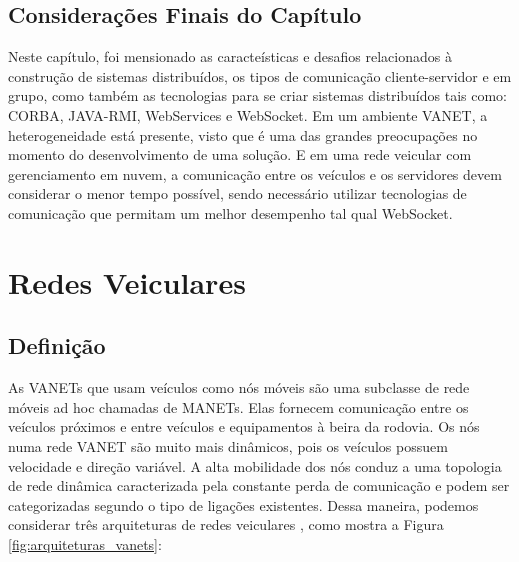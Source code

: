 \documentclass[
	12pt,				%
	oneside,			%
	a4paper,			%
	english,			%
	brazil				%
	]{abntex2ppgsi}
\begin{document}

\section{Considerações Finais do Capítulo}
 
Neste capítulo, foi mensionado as caracteísticas e desafios relacionados à construção de sistemas distribuídos, os tipos de comunicação cliente-servidor e em grupo, como também as tecnologias para se criar sistemas distribuídos tais como: CORBA, JAVA-RMI, WebServices e WebSocket. Em um ambiente VANET, a heterogeneidade está presente, visto que é uma das grandes preocupações no momento do desenvolvimento de uma solução. E em uma rede veicular com gerenciamento em nuvem, a comunicação entre os veículos e os servidores devem considerar o menor tempo possível, sendo necessário utilizar tecnologias de comunicação que permitam um melhor desempenho tal qual WebSocket.

\chapter{Redes Veiculares}

\section{Definição}

As VANETs que usam veículos como nós móveis são uma subclasse de rede móveis ad hoc chamadas de MANETs. Elas fornecem comunicação entre os veículos próximos e entre veículos e equipamentos à beira da rodovia. Os nós numa rede VANET são muito mais dinâmicos, pois os veículos possuem velocidade e direção variável. A alta mobilidade dos nós conduz a uma topologia de rede dinâmica caracterizada pela constante perda de comunicação \cite{bubenikova2014security} \cite{jakubiak2008state} e podem ser categorizadas segundo o tipo de ligações existentes. Dessa maneira, podemos considerar três arquiteturas de redes veiculares \cite{luis2009melhoria}, como mostra a Figura \ref{fig:arquiteturas_vanets}: 
\end{document}
